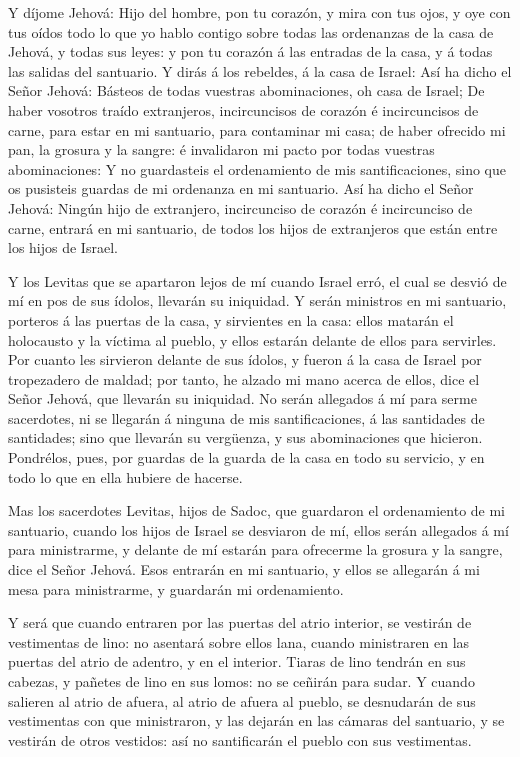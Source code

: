  Y díjome Jehová: Hijo del hombre, pon tu corazón, y mira
con tus ojos, y oye con tus oídos todo lo que yo hablo contigo sobre
todas las ordenanzas de la casa de Jehová, y todas sus leyes: y pon tu
corazón á las entradas de la casa, y á todas las salidas del santuario.
 Y dirás á los rebeldes, á la casa de Israel: Así ha dicho
el Señor Jehová: Básteos de todas vuestras abominaciones, oh casa de
Israel;  De haber vosotros traído extranjeros, incircuncisos
de corazón é incircuncisos de carne, para estar en mi santuario, para
contaminar mi casa; de haber ofrecido mi pan, la grosura y la sangre: é
invalidaron mi pacto por todas vuestras abominaciones:  Y no
guardasteis el ordenamiento de mis santificaciones, sino que os
pusisteis guardas de mi ordenanza en mi santuario.  Así ha
dicho el Señor Jehová: Ningún hijo de extranjero, incircunciso de
corazón é incircunciso de carne, entrará en mi santuario, de todos los
hijos de extranjeros que están entre los hijos de Israel.

 Y los Levitas que se apartaron lejos de mí cuando Israel
erró, el cual se desvió de mí en pos de sus ídolos, llevarán su
iniquidad.  Y serán ministros en mi santuario, porteros á
las puertas de la casa, y sirvientes en la casa: ellos matarán el
holocausto y la víctima al pueblo, y ellos estarán delante de ellos para
servirles.  Por cuanto les sirvieron delante de sus ídolos,
y fueron á la casa de Israel por tropezadero de maldad; por tanto, he
alzado mi mano acerca de ellos, dice el Señor Jehová, que llevarán su
iniquidad.  No serán allegados á mí para serme sacerdotes,
ni se llegarán á ninguna de mis santificaciones, á las santidades de
santidades; sino que llevarán su vergüenza, y sus abominaciones que
hicieron.  Pondrélos, pues, por guardas de la guarda de la
casa en todo su servicio, y en todo lo que en ella hubiere de hacerse.

 Mas los sacerdotes Levitas, hijos de Sadoc, que guardaron
el ordenamiento de mi santuario, cuando los hijos de Israel se desviaron
de mí, ellos serán allegados á mí para ministrarme, y delante de mí
estarán para ofrecerme la grosura y la sangre, dice el Señor Jehová.
 Esos entrarán en mi santuario, y ellos se allegarán á mi
mesa para ministrarme, y guardarán mi ordenamiento.

 Y será que cuando entraren por las puertas del atrio
interior, se vestirán de vestimentas de lino: no asentará sobre ellos
lana, cuando ministraren en las puertas del atrio de adentro, y en el
interior.  Tiaras de lino tendrán en sus cabezas, y pañetes
de lino en sus lomos: no se ceñirán para sudar.  Y cuando
salieren al atrio de afuera, al atrio de afuera al pueblo, se desnudarán
de sus vestimentas con que ministraron, y las dejarán en las cámaras del
santuario, y se vestirán de otros vestidos: así no santificarán el
pueblo con sus vestimentas.

